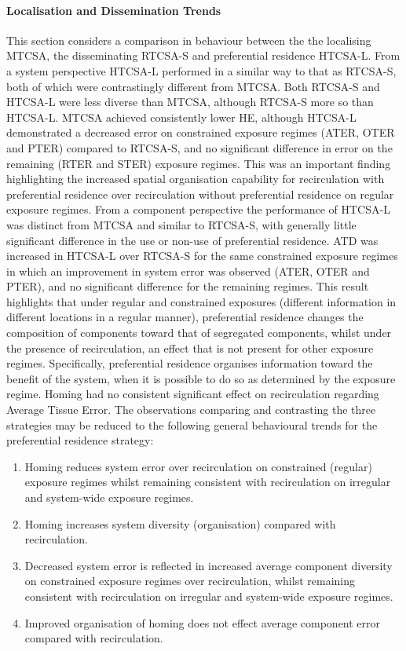 \paragraph{Localisation and Dissemination Trends}
This section considers a comparison in behaviour between the the localising MTCSA, the disseminating RTCSA-S and preferential residence HTCSA-L. 
From a system perspective HTCSA-L performed in a similar way to that as RTCSA-S, both of which were contrastingly different from MTCSA. Both RTCSA-S and HTCSA-L were less diverse than MTCSA, although RTCSA-S more so than HTCSA-L. MTCSA achieved consistently lower HE, although HTCSA-L demonstrated a decreased error on constrained exposure regimes (ATER, OTER and PTER) compared to RTCSA-S, and no significant difference in error on the remaining (RTER and STER) exposure regimes. This was an important finding highlighting the increased spatial organisation capability for recirculation with preferential residence over recirculation without preferential residence on regular exposure regimes.
From a component perspective the performance of HTCSA-L was distinct from MTCSA and similar to RTCSA-S, with generally little significant difference in the use or non-use of preferential residence. ATD was increased in HTCSA-L over RTCSA-S for the same constrained exposure regimes in which an improvement in system error was observed (ATER, OTER and PTER), and no significant difference for the remaining regimes. This result highlights that under regular and constrained exposures (different information in different locations in a regular manner), preferential residence changes the composition of components toward that of segregated components, whilst under the presence of  recirculation, an effect that is not present for other exposure regimes. Specifically, preferential residence organises information toward the benefit of the system, when it is possible to do so as determined by the exposure regime. Homing had no consistent significant effect on recirculation regarding Average Tissue Error.
The observations comparing and contrasting the three strategies may be reduced to the following general behavioural trends for the preferential residence strategy:

\begin{enumerate}	
	\item Homing reduces system error over recirculation on constrained (regular) exposure regimes whilst remaining consistent with recirculation on irregular and system-wide exposure regimes.
	\item Homing increases system diversity (organisation) compared with recirculation.
	\item Decreased system error is reflected in increased average component diversity on constrained exposure regimes over recirculation, whilst remaining consistent with recirculation on irregular and system-wide exposure regimes.
	\item Improved organisation of homing does not effect average component error compared with recirculation.
\end{enumerate}

